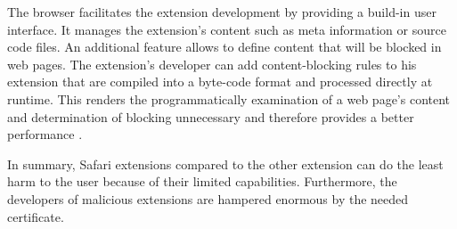 	The browser facilitates the extension development by providing a build-in user interface. It manages the extension's content such as meta information or source code files.	An additional feature allows to define content that will be blocked in web pages. The extension's developer can add content-blocking rules to his extension that are compiled into a byte-code format and processed directly at runtime. This renders the programmatically examination of a web page's content and determination of blocking unnecessary and therefore provides a better performance \cite{safariContentBlockingRules}.
	
	In summary, Safari extensions compared to the other extension can do the least harm to the user because of their limited capabilities. Furthermore, the developers of malicious extensions are hampered enormous by the needed certificate. 